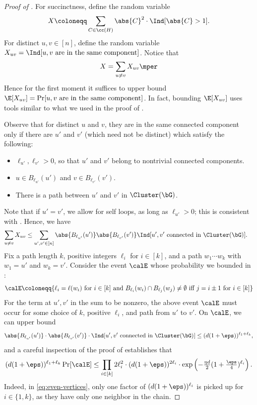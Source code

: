 \documentclass[11pt,letterpaper]{article}
\begin{document}
\begin{proof}[Proof of ]
    For succinctness, define the random variable 
    \begin{align*}
        X \coloneqq \sum_{C \in \cc(H)} \abs{C}^2 \cdot \Ind[\abs{C} > 1].
    \end{align*}
    For distinct $u, v \in [n]$, define the random variable $X_{uv} = \Ind[u, v \text{ are in the same component}]$. 
    Notice that 
    \begin{align*}
        X = \sum_{u \neq v} X_{uv}\mper
    \end{align*}
    Hence for the first moment it suffices to upper bound $\E[X_{uv}] = \Pr[u, v \text{ are in the same component}]$. 
    In fact, bounding $\E[X_{uv}]$ uses tools similar to what we used in the proof of .

    Observe that for distinct $u$ and $v$, they are in the same connected component only if there are $u'$ and $v'$ (which need not be distinct) which satisfy the following:
    \begin{itemize}
        \item $\ell_{u'}, \ell_{v'} > 0$, so that $u'$ and $v'$ belong to nontrivial connected components.
        \item $u \in B_{\ell_{u'}}(u')$ and $v \in B_{\ell_{v'}}(v')$.
        \item There is a path between $u'$ and $v'$ in $\Cluster(\bG)$. 
    \end{itemize}
    Note that if $u' = v'$, we allow for self loops, as long as $\ell_{u'} > 0$; this is consistent with .
    Hence, we have 
    \begin{align*}
        \sum_{u \neq v} X_{uv} &\le \sum_{u', v' \in [n]} \abs{B_{\ell_{u'}}(u')} \abs{B_{\ell_{v'}}(v')} \Ind[u', v' \text{ connected in } \Cluster(\bG)].
    \end{align*}
    Fix a path length $k$, positive integers $\ell_i$ for $i \in [k]$, and a path $w_1\cdots w_k$ with $w_1 = u'$ and $w_k = v'$.
    Consider the event $\calE$ whose probability we bounded in :
    \[
        \calE \coloneqq \{\ell_i = \ell(w_i) \text{ for $i \in [k]$ and } B_{\ell_i}(w_i) \cap B_{\ell_{j}}(w_{j}) \ne \emptyset \text{ iff $j = i \pm 1$ for $i \in [k]$}\}
    \]
    For the term at $u', v'$ in the sum to be nonzero, the above event $\calE$ must occur for some choice of $k$, positive $\ell_i$, and path from $u'$ to $v'$. 
    On $\calE$, we can upper bound 
    \[
        \abs{B_{\ell_{u'}}(u')} \cdot \abs{B_{\ell_{v'}}(v')} \cdot \Ind[u', v' \text{ connected in } \Cluster(\bG)] \le (d(1+\eps))^{\ell_1 + \ell_k},
    \]
    and a careful inspection of the proof of  establishes that
    \begin{align*}
        (d(1+\eps))^{\ell_1 + \ell_k}\Pr[\calE] \le \prod_{i \in [k]} 2\ell_i^2 \cdot (d(1+\eps))^{2\ell_i} \cdot \exp\left(-\tfrac{\eta d}{2}(1+\tfrac{\eps}{4})^{\ell_i}\right).
    \end{align*}
    Indeed, in \eqref{eq:even-vertices}, only one factor of $(d(1+\eps))^{\ell_i}$ is picked up for $i \in \{1, k\}$, as they have only one neighbor in the chain. 


\end{proof}
\end{document}
